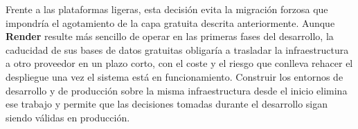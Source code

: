 Frente a las plataformas ligeras, esta decisión evita la migración forzosa que impondría el agotamiento de la capa gratuita descrita anteriormente. Aunque \textbf{Render} resulte más sencillo de operar en las primeras fases del desarrollo, la caducidad de sus bases de datos gratuitas obligaría a trasladar la infraestructura a otro proveedor en un plazo corto, con el coste y el riesgo que conlleva rehacer el despliegue una vez el sistema está en funcionamiento. Construir los entornos de desarrollo y de producción sobre la misma infraestructura desde el inicio elimina ese trabajo y permite que las decisiones tomadas durante el desarrollo sigan siendo válidas en producción.
